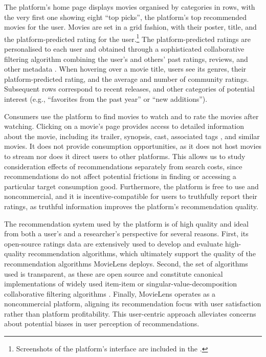 \documentclass[12pt]{article}
\theoremstyle{newtheorem}
\begin{document}
The platform's home page displays movies organised by categories in rows, with the very first one showing eight ``top picks'', the platform's top recommended movies for the user. 
Movies are set in a grid fashion, with their poster, title, and the platform-predicted rating for the user.\footnote{
    Screenshots of the platform's interface are included in the .
} 
The platform-predicted ratings are personalised to each user and obtained through a sophisticated collaborative filtering algorithm combining the user's and others' past ratings, reviews, and other metadata \citep{HarperKonstan2015ACMTIIS}. 
When hovering over a movie title, users see its genres, their platform-predicted rating, and the average and number of community ratings. 
Subsequent rows correspond to recent releases, and other categories of potential interest (e.g., ``favorites from the past year'' or ``new additions'').


Consumers use the platform to find movies to watch and to rate the movies after watching. 
Clicking on a movie's page provides access to detailed information about the movie, including its trailer, synopsis, cast, associated tags \citep{VigSenRiedl2012ACM}, and similar movies.
It does not provide consumption opportunities, as it does not host movies to stream nor does it direct users to other platforms.
This allows us to study consideration effects of recommendations separately from search costs, since recommendations do not affect potential frictions in finding or accessing a particular target consumption good. 
Furthermore, the platform is free to use and noncommercial, and it is incentive-compatible for users to truthfully report their ratings, as truthful information improves the platform's recommendation quality.


The recommendation system used by the platform is of high quality and ideal from both a user's and a researcher's perspective for several reasons. 
First, its open-source ratings data are extensively used to develop and evaluate high-quality recommendation algorithms, which ultimately support the quality of the recommendation algorithms MovieLens deploys. 
Second, the set of algorithms used is transparent, as these are open source and constitute canonical implementations of widely used item-item or singular-value-decomposition collaborative filtering algorithms \citep[see][]{EkstrandLudwigKolbRiedl2011}. 
Finally, MovieLens operates as a noncommercial platform, aligning its recommendation focus with user satisfaction rather than platform profitability. 
This user-centric approach alleviates concerns about potential biases in user perception of recommendations.
\end{document}
